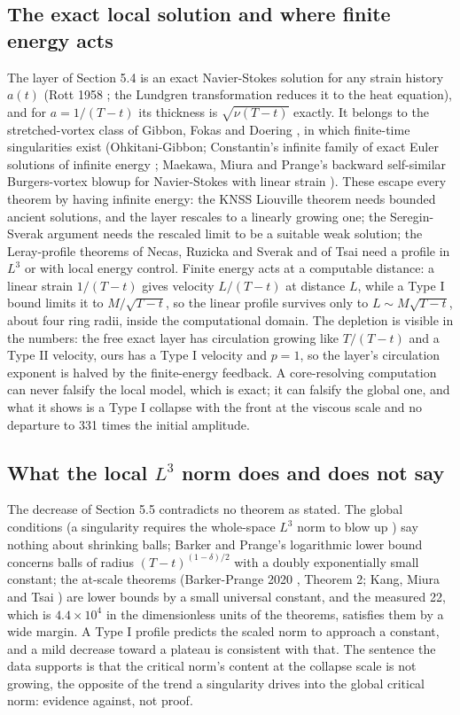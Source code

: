 \documentclass[11pt]{article}
\newcommand{\sn}[2]{#1\times 10^{#2}}
\begin{document}
\subsection{The exact local solution and where finite energy acts}

The layer of Section 5.4 is an exact Navier-Stokes solution for any strain history $a(t)$ (Rott 1958 \cite{R58}; the Lundgren transformation \cite{L82} reduces it to the heat equation), and for $a = 1 / (T - t)$ its thickness is $\sqrt{\nu (T - t)}$ exactly. It belongs to the stretched-vortex class of Gibbon, Fokas and Doering \cite{GFD99}, in which finite-time singularities exist (Ohkitani-Gibbon; Constantin's infinite family of exact Euler solutions of infinite energy \cite{C00}; Maekawa, Miura and Prange's backward self-similar Burgers-vortex blowup for Navier-Stokes with linear strain \cite{MMP19}). These escape every theorem by having infinite energy: the KNSS Liouville theorem \cite{KNSS09} needs bounded ancient solutions, and the layer rescales to a linearly growing one; the Seregin-Sverak argument \cite{SS09} needs the rescaled limit to be a suitable weak solution; the Leray-profile theorems of Necas, Ruzicka and Sverak \cite{NRS96} and of Tsai \cite{T98} need a profile in $L^3$ or with local energy control. Finite energy acts at a computable distance: a linear strain $1 / (T - t)$ gives velocity $L / (T - t)$ at distance $L$, while a Type I bound limits it to $M / \sqrt{T - t}$, so the linear profile survives only to $L \sim M \sqrt{T - t}$, about four ring radii, inside the computational domain. The depletion is visible in the numbers: the free exact layer has circulation growing like $T / (T - t)$ and a Type II velocity, ours has a Type I velocity and $p = 1$, so the layer's circulation exponent is halved by the finite-energy feedback. A core-resolving computation can never falsify the local model, which is exact; it can falsify the global one, and what it shows is a Type I collapse with the front at the viscous scale and no departure to 331 times the initial amplitude.

\subsection{What the local $L^3$ norm does and does not say}

The decrease of Section 5.5 contradicts no theorem as stated. The global conditions (a singularity requires the whole-space $L^3$ norm to blow up \cite{ESS03,S12}) say nothing about shrinking balls; Barker and Prange's logarithmic lower bound \cite{BP21} concerns balls of radius $(T - t)^{(1 - \delta) / 2}$ with a doubly exponentially small constant; the at-scale theorems (Barker-Prange 2020 \cite{BP20}, Theorem 2; Kang, Miura and Tsai \cite{KMT21}) are lower bounds by a small universal constant, and the measured 22, which is $\sn{4.4}{4}$ in the dimensionless units of the theorems, satisfies them by a wide margin. A Type I profile predicts the scaled norm to approach a constant, and a mild decrease toward a plateau is consistent with that. The sentence the data supports is that the critical norm's content at the collapse scale is not growing, the opposite of the trend a singularity drives into the global critical norm: evidence against, not proof.
\end{document}
